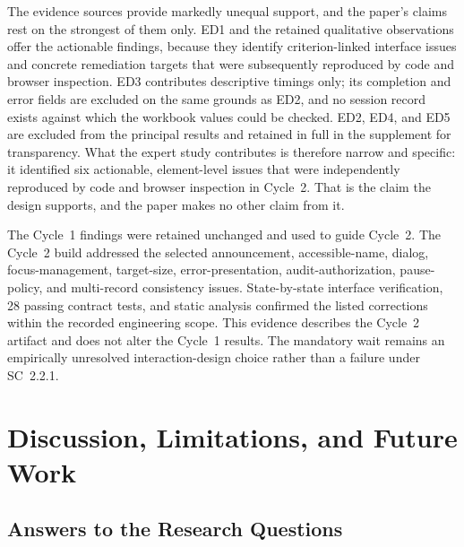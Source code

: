 \documentclass[journal]{IEEEtran}
\begin{document}
The evidence sources provide markedly unequal support, and the paper's claims rest on the strongest of them only. ED1 and the retained qualitative observations offer the actionable findings, because they identify criterion-linked interface issues and concrete remediation targets that were subsequently reproduced by code and browser inspection. ED3 contributes descriptive timings only; its completion and error fields are excluded on the same grounds as ED2, and no session record exists against which the workbook values could be checked. ED2, ED4, and ED5 are excluded from the principal results and retained in full in the supplement for transparency. What the expert study contributes is therefore narrow and specific: it identified six actionable, element-level issues that were independently reproduced by code and browser inspection in Cycle~2. That is the claim the design supports, and the paper makes no other claim from it.

The Cycle~1 findings were retained unchanged and used to guide Cycle~2. The Cycle~2 build addressed the selected announcement, accessible-name, dialog, focus-management, target-size, error-presentation, audit-authorization, pause-policy, and multi-record consistency issues. State-by-state interface verification, 28 passing contract tests, and static analysis confirmed the listed corrections within the recorded engineering scope. This evidence describes the Cycle~2 artifact and does not alter the Cycle~1 results. The mandatory wait remains an empirically unresolved interaction-design choice rather than a failure under SC~2.2.1.



\section{Discussion, Limitations, and Future Work}
\label{sec:discussion}

\subsection{Answers to the Research Questions}
\end{document}
